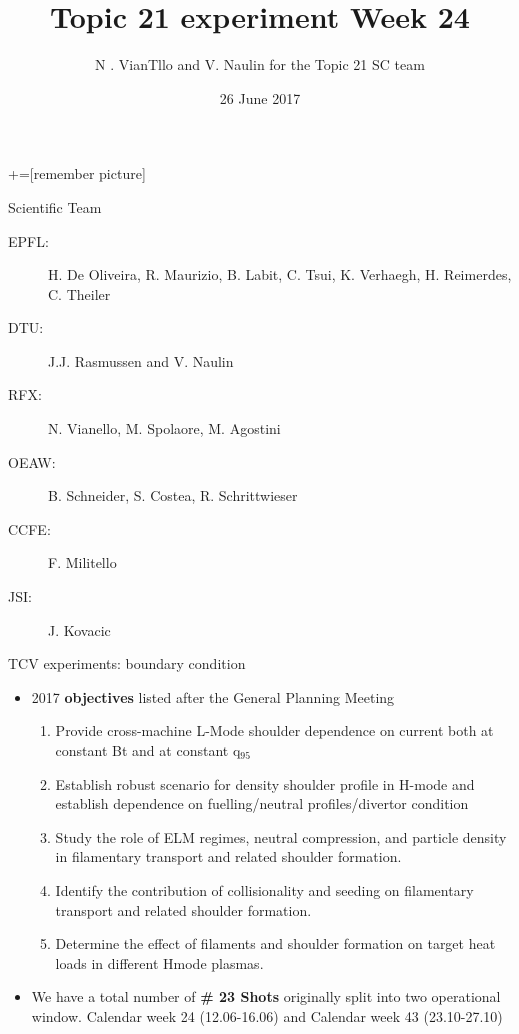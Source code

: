 \documentclass[10pt, compress]{beamer}
\title{Topic 21 experiment Week 24}
\date{26 June 2017}
\author[Topic 21 ST]{N . VianTllo and V. Naulin for the
  Topic 21 SC team}
\newcommand\Fontvi{\fontsize{8}{7.2}\selectfont}
\begin{document}
+=[remember picture]
\maketitle
\begin{frame}{Scientific Team}
  \begin{description}
  \item[EPFL:] H. De Oliveira, R. Maurizio, B. Labit,
    C. Tsui, K. Verhaegh, H. Reimerdes, C. Theiler
  \item[DTU:] J.J. Rasmussen and V. Naulin
  \item[RFX:] N. Vianello, M. Spolaore, M. Agostini
  \item[OEAW:] B. Schneider, S. Costea, R. Schrittwieser
  \item[CCFE:] F. Militello
  \item[JSI:] J. Kovacic
  \end{description}
\end{frame}
\begin{frame}{TCV experiments: boundary condition}
\vspace{-1cm}
\Fontvi
\begin{itemize}
\item 2017 \textbf{objectives} listed after the General Planning Meeting
  \begin{enumerate}
  \item Provide cross-machine \alert{L-Mode} shoulder dependence on
    current both at constant Bt and at constant q$_{95}$
  \item Establish robust scenario for density shoulder profile in
        H-mode and establish dependence on fuelling/neutral
        profiles/divertor condition
  \item Study the role of ELM regimes, neutral compression, and
    particle density in filamentary transport and related shoulder
    formation.
  \item Identify the contribution of collisionality and
    seeding on filamentary transport and related shoulder
    formation.
  \item Determine the effect of filaments and shoulder
    formation on target heat loads in different Hmode plasmas.
  \end{enumerate}
\item We have a total number of \textbf{\# 23 Shots} originally split into two
    operational window. Calendar week 24 (12.06-16.06) and Calendar
    week 43 (23.10-27.10)
\end{itemize}
\end{frame}
\end{document}
